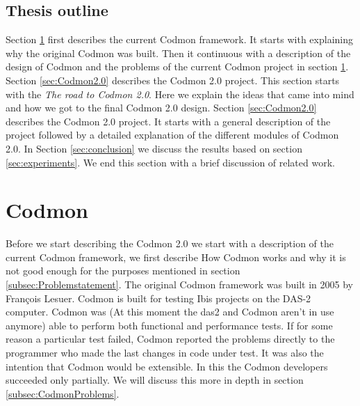 \documentclass[a4paper,10pt]{scrartcl}
\newcommand{\project}{Codmon 2.0}
\begin{document}
\subsection{Thesis outline}
\label{subsec:Thesisoutline}
Section \ref{sec:codmon} first describes the current Codmon framework. It starts with explaining why the original Codmon was built. Then it continuous with a description of the design of Codmon
and the problems of the current Codmon project in section \ref{sec:codmon}. Section \ref{sec:Codmon2.0} describes the \project{} project. This section starts with the \emph{The road 
to \project{}}. Here we explain the ideas that came into mind and how we got to the final \project{} design. Section \ref{sec:Codmon2.0} describes the \project{} project. It starts with 
a general description of the project followed by a detailed explanation of the different modules of \project{}. In Section \ref{sec:conclusion} we discuss the results based on section \ref{sec:experiments}. We end this section with a brief discussion of related work.

\newpage

\section{Codmon}
\label{sec:codmon}
Before we start describing the \project{} we start with a description of the current Codmon framework, we first describe How Codmon works and why it is not good enough for the purposes mentioned
in section \ref{subsec:Problemstatement}. The original Codmon framework was built in 2005 by François Lesuer\cite{Codmon}. Codmon is built for testing Ibis projects\cite{Ibis}\cite{Satin}\cite{MPJ}\cite{IPL}\cite{GMI} 
on the DAS-2\cite{das2} computer. Codmon was (At this moment the das2 and Codmon aren't in use anymore) able to perform both functional and performance tests. If for some reason a particular
test failed, Codmon reported the problems directly to the programmer who made the last changes in code under test. It was also the intention that Codmon would be extensible. In this the Codmon 
developers succeeded only partially. We will discuss this more in depth in section \ref{subsec:CodmonProblems}.  
\end{document}
